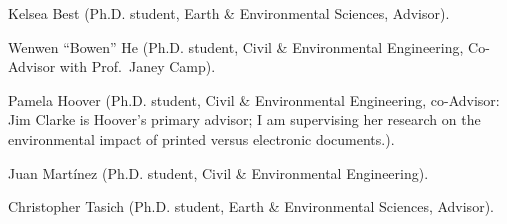 \item Kelsea Best (Ph.D. student, Earth \& Environmental Sciences, Advisor).
\item Wenwen ``Bowen'' He (Ph.D. student, Civil \& Environmental Engineering, Co-Advisor with Prof.\ Janey Camp).
\item Pamela Hoover (Ph.D. student, Civil \& Environmental Engineering, co-Advisor: Jim Clarke is Hoover's primary advisor; I am supervising her research on the environmental impact of printed versus electronic documents.).
\item Juan Mart\'inez (Ph.D. student, Civil \& Environmental Engineering).
\item Christopher Tasich (Ph.D. student, Earth \& Environmental Sciences, Advisor).
